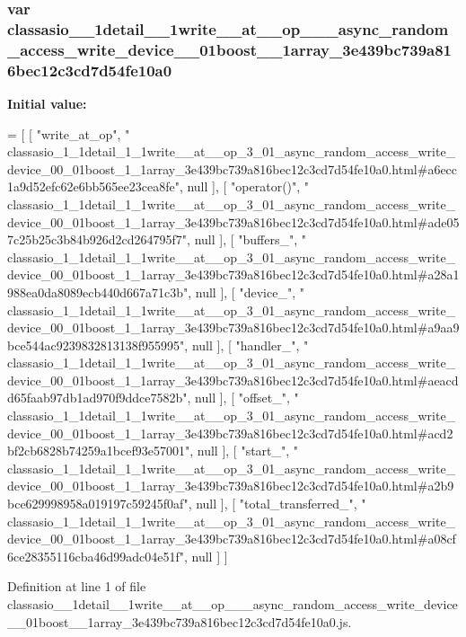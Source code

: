 \subsubsection[{classasio\+\_\+1\+\_\+1detail\+\_\+1\+\_\+1write\+\_\+\+\_\+at\+\_\+\+\_\+op\+\_\+3\+\_\+01\+\_\+async\+\_\+random\+\_\+access\+\_\+write\+\_\+device\+\_\+00\+\_\+01boost\+\_\+1\+\_\+1array\+\_\+3e439bc739a816bec12c3cd7d54fe10a0}]{\setlength{\rightskip}{0pt plus 5cm}var classasio\+\_\+\_\+1detail\+\_\+\_\+1write\+\_\+\+\_\+at\+\_\+\+\_\+op\+\_\+\_\+\_\+async\+\_\+random\+\_\+access\+\_\+write\+\_\+device\+\_\+\_\+01boost\+\_\+\_\+1array\+\_\+3e439bc739a816bec12c3cd7d54fe10a0}\label{classasio__1__1detail__1__1write____at____op__3__01__async__random__access__write__device__00__0621f37c6c6200352c080fe69824512b7_ac597a895487909c21ecab615065aa2ad}
{\bfseries Initial value\+:}
\begin{DoxyCode}
=
[
    [ \textcolor{stringliteral}{"write\_at\_op"}, \textcolor{stringliteral}{"
      classasio\_1\_1detail\_1\_1write\_\_at\_\_op\_3\_01\_async\_random\_access\_write\_device\_00\_01boost\_1\_1array\_3e439bc739a816bec12c3cd7d54fe10a0.html#a6ecc1a9d52efc62e6bb565ee23cea8fe"}, null ],
    [ \textcolor{stringliteral}{"operator()"}, \textcolor{stringliteral}{"
      classasio\_1\_1detail\_1\_1write\_\_at\_\_op\_3\_01\_async\_random\_access\_write\_device\_00\_01boost\_1\_1array\_3e439bc739a816bec12c3cd7d54fe10a0.html#ade057c25b25c3b84b926d2cd264795f7"}, null ],
    [ \textcolor{stringliteral}{"buffers\_"}, \textcolor{stringliteral}{"
      classasio\_1\_1detail\_1\_1write\_\_at\_\_op\_3\_01\_async\_random\_access\_write\_device\_00\_01boost\_1\_1array\_3e439bc739a816bec12c3cd7d54fe10a0.html#a28a1988ea0da8089ecb440d667a71c3b"}, null ],
    [ \textcolor{stringliteral}{"device\_"}, \textcolor{stringliteral}{"
      classasio\_1\_1detail\_1\_1write\_\_at\_\_op\_3\_01\_async\_random\_access\_write\_device\_00\_01boost\_1\_1array\_3e439bc739a816bec12c3cd7d54fe10a0.html#a9aa9bce544ac9239832813138f955995"}, null ],
    [ \textcolor{stringliteral}{"handler\_"}, \textcolor{stringliteral}{"
      classasio\_1\_1detail\_1\_1write\_\_at\_\_op\_3\_01\_async\_random\_access\_write\_device\_00\_01boost\_1\_1array\_3e439bc739a816bec12c3cd7d54fe10a0.html#aeacdd65faab97db1ad970f9ddce7582b"}, null ],
    [ \textcolor{stringliteral}{"offset\_"}, \textcolor{stringliteral}{"
      classasio\_1\_1detail\_1\_1write\_\_at\_\_op\_3\_01\_async\_random\_access\_write\_device\_00\_01boost\_1\_1array\_3e439bc739a816bec12c3cd7d54fe10a0.html#acd2bf2cb6828b74259a1bcef93e57001"}, null ],
    [ \textcolor{stringliteral}{"start\_"}, \textcolor{stringliteral}{"
      classasio\_1\_1detail\_1\_1write\_\_at\_\_op\_3\_01\_async\_random\_access\_write\_device\_00\_01boost\_1\_1array\_3e439bc739a816bec12c3cd7d54fe10a0.html#a2b9bce629998958a019197c59245f0af"}, null ],
    [ \textcolor{stringliteral}{"total\_transferred\_"}, \textcolor{stringliteral}{"
      classasio\_1\_1detail\_1\_1write\_\_at\_\_op\_3\_01\_async\_random\_access\_write\_device\_00\_01boost\_1\_1array\_3e439bc739a816bec12c3cd7d54fe10a0.html#a08cf6ce28355116cba46d99adc04e51f"}, null ]
]
\end{DoxyCode}


Definition at line 1 of file classasio\+\_\+\_\+1detail\+\_\+\_\+1write\+\_\+\+\_\+at\+\_\+\+\_\+op\+\_\+\_\+\_\+async\+\_\+random\+\_\+access\+\_\+write\+\_\+device\+\_\+\_\+01boost\+\_\+\_\+1array\+\_\+3e439bc739a816bec12c3cd7d54fe10a0.\+js.

